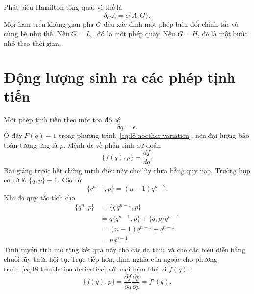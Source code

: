 Phát biểu Hamilton tổng quát vì thế là
\begin{equation}
  \boxed{\delta_G A=\epsilon\{A,G\}.}
  \label{eq:l8-generator-rule}
\end{equation}
Mọi hàm trên không gian pha \(G\) đều xác định một phép biến đổi chính tắc
vô cùng bé như thế. Nếu \(G=L_z\), đó là một phép quay. Nếu \(G=H\), đó là một
bước nhỏ theo thời gian.

\begin{classroomqa}
\end{classroomqa}

\section{Động lượng sinh ra các phép tịnh tiến}

Một phép tịnh tiến theo một tọa độ có
\begin{equation}
  \delta q=\epsilon.
  \label{eq:l8-q-translation}
\end{equation}
Ở đây \(F(q)=1\) trong phương trình~\eqref{eq:l8-noether-variation}, nên đại lượng bảo toàn tương ứng
là \(p\). Mệnh đề về phần sinh dự đoán
\begin{equation}
  \{f(q),p\}=\frac{df}{dq}.
  \label{eq:l8-translation-derivative}
\end{equation}
Bài giảng trước hết chứng minh điều này cho lũy thừa bằng quy nạp. Trường hợp cơ sở là
\(\{q,p\}=1\). Giả sử
\begin{equation}
  \{q^{n-1},p\}=(n-1)q^{n-2}.
  \label{eq:l8-induction-hypothesis}
\end{equation}
Khi đó quy tắc tích cho
\begin{align}
  \{q^n,p\}
  &=\{q\,q^{n-1},p\}\\
  &=q\{q^{n-1},p\}+\{q,p\}q^{n-1}\\
  &=(n-1)q^{n-1}+q^{n-1}\\
  &=nq^{n-1}.
  \label{eq:l8-power-translation}
\end{align}
Tính tuyến tính mở rộng kết quả này cho các đa thức và cho các biểu diễn bằng chuỗi lũy thừa hội tụ.
Trực tiếp hơn, định nghĩa của ngoặc cho phương trình~\eqref{eq:l8-translation-derivative} với mọi hàm khả vi \(f(q)\):
\begin{equation}
  \{f(q),p\}
  =
  \frac{\partial f}{\partial q}
  \frac{\partial p}{\partial p}
  =f'(q).
\end{equation}


